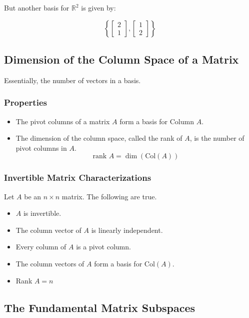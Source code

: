         But another basis for $\mathbb{R}^2$ is given by:

        \[
        \left\{ \left[ \begin{array}{c}
        2\\
        1
        \end{array}\right],
        \left[ \begin{array}{c}
        1\\
        2
        \end{array}\right]\right\}
        \]
    \subsection{Dimension of the Column Space of a Matrix}
    Essentially, the number of vectors in a basis.

        \subsubsection{Properties}
        \begin{itemize}
            \item The pivot columns of a matrix $A$ form a basis for Column $A$.
            \item The dimension of the column space, called the rank of $A$, is the number of pivot columns in $A$.
                \[
                    \text{rank } A = \dim(\text{Col}(A))
                \]
        \end{itemize}

        \subsubsection{Invertible Matrix Characterizations}
        Let $A$ be an $n \times n$ matrix. The following are true.
        \begin{itemize}
            \item $A$ is invertible.
            \item The column vector of $A$ is linearly independent.
            \item Every column of $A$ is a pivot column.
            \item The column vectors of $A$ form a basis for Col$(A)$.
            \item Rank $A = n$
        \end{itemize}

    \subsection{The Fundamental Matrix Subspaces}
